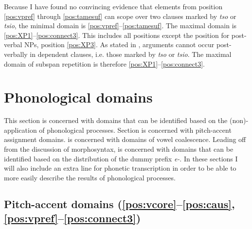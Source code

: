 \documentclass[output=paper,hidelinks]{langscibook}
\begin{document}
Because I have found no convincing evidence that elements from position \ref{pos:vpref} through \ref{pos:tamesuf} can scope over two clauses marked by \textit{tso} or \textit{tsio}, the minimal domain is \ref{pos:vpref}--\ref{pos:tamesuf}. The maximal domain is \ref{pos:XP1}--\ref{pos:connect3}. This includes all positions except the position for post-verbal NPs, position \ref{pos:XP3}. As stated in , arguments cannot occur post-verbally in dependent clauses, i.e. those marked by \textit{tso} or \textit{tsio}. The maximal domain of subspan repetition is therefore \ref{pos:XP1}--\ref{pos:connect3}.



\section{Phonological domains}

\label{araona:sec:phonologicaldomains}

This section is concerned with domains that can be identified based on the (non)-application of phonological processes. Section  is concerned with pitch-accent assignment domains.  is concerned with domains of vowel coalescence. Leading off from the discussion of morphosyntax,  is concerned with domains that can be identified based on the distribution of the dummy prefix \textit{e-}. In these sections I will also include an extra line for phonetic transcription in order to be able to more easily describe the results of phonological processes.

\largerpage
\subsection{Pitch-accent domains (\ref{pos:vcore}--\ref{pos:caus}, \ref{pos:vpref}--\ref{pos:connect3})}
\label{sec:lh}
\end{document}

